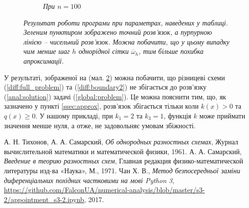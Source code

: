 \begin{figure}[h!]
\begin{subfigure}{.5\textwidth}
  \caption{\it При \(n = 100\)}
  \label{fig:sub2}
\end{subfigure}
\caption{{\it Результат роботи програми \cite{SourceCode} при параметрах, наведених у таблиці. Зеленим пунктиром зображено точний розв'язок, а пурпурною лінією -- чисельний розв'язок. Можна побачити, що у цьому випадку чим менше шаг \(h\) однорідної сітки \( \overline{\omega}_h\), тим більше похибка апроксимації.}}
\label{fig:res2}
\end{figure}

У результаті, зображеної на (мал. \ref{fig:res2}) можна побачити, що різницеві схеми (\ref{diff:full_problem}) та (\ref{diff:boundary2}) не збігається до розв'язку (\ref{anal:solution}) задачі (\ref{global:problem}). Це можна пояснити тим, що, як зазначено у пункті \ref{ssec:approx}, розв'язок збігається тільки коли \( k(x) > 0\) та \(q(x) \geq 0\). У нашому прикладі, при \( k_1 = 2\) та  \( k_3 = 1\), функція \(k\) може приймати значення менше нуля, а отже, не задовольняє умовам збіжності.

\begin{thebibliography}{9}

  А. Н. Тихонов, А. А. Самарский,
  \emph{Об однородных разностных схемах},
  Журнал вычислительной математики и математической физики, 1961.
  А. А. Самарский,
  \emph{Введение в теорию разностных схем},
  Главная редакция физико-математической литературы изд-ва «Наука», 
  М., 1971. 
  Чан Х. В., \emph{Метод безпосередньої заміни диференціальних похідних частковими на мові Python 3},
  \url{https://github.com/FalconUA/numerical-analysis/blob/master/s3-2/appointment_s3-2.ipynb}, 2017.

\end{thebibliography}

